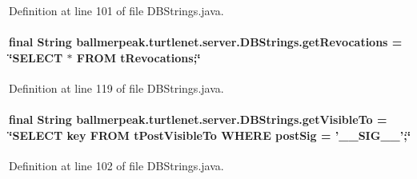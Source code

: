 Definition at line 101 of file D\-B\-Strings.\-java.

\hypertarget{classballmerpeak_1_1turtlenet_1_1server_1_1DBStrings_a8dc5636da5576be650e1de5c08109bc8}{
\paragraph[{get\-Revocations}]{\setlength{\rightskip}{0pt plus 5cm}final String ballmerpeak.\-turtlenet.\-server.\-D\-B\-Strings.\-get\-Revocations = \char`\"{}S\-E\-L\-E\-C\-T $\ast$ F\-R\-O\-M t\-Revocations;\char`\"{}\hspace{0.3cm}{\ttfamily [static]}}}\label{classballmerpeak_1_1turtlenet_1_1server_1_1DBStrings_a8dc5636da5576be650e1de5c08109bc8}


Definition at line 119 of file D\-B\-Strings.\-java.

\hypertarget{classballmerpeak_1_1turtlenet_1_1server_1_1DBStrings_a977f96408405a039b29ea0375f014129}{
\paragraph[{get\-Visible\-To}]{\setlength{\rightskip}{0pt plus 5cm}final String ballmerpeak.\-turtlenet.\-server.\-D\-B\-Strings.\-get\-Visible\-To = \char`\"{}S\-E\-L\-E\-C\-T key F\-R\-O\-M t\-Post\-Visible\-To W\-H\-E\-R\-E post\-Sig = '\-\_\-\-\_\-\-S\-I\-G\-\_\-\-\_\-';\char`\"{}\hspace{0.3cm}{\ttfamily [static]}}}\label{classballmerpeak_1_1turtlenet_1_1server_1_1DBStrings_a977f96408405a039b29ea0375f014129}


Definition at line 102 of file D\-B\-Strings.\-java.

